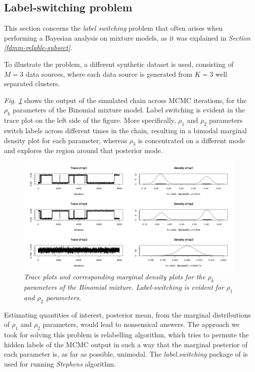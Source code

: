 \subsection{Label-switching problem} \label{integr-synth-label-sect}
This section concerns the \emph{label switching} problem that often arises when performing a Bayesian analysis on mixture models, as it was explained in \emph{Section \ref{fdmm-relable-subsect}}.

To illustrate the problem, a different synthetic dataset is used, consisting of $M=3$ data sources, where each data source is generated from $K=3$ well separated clusters. 

\emph{Fig. \ref{labelBP-pic}} shows the output of the simulated chain across MCMC iterations, for the $\rho_{k}$ parameters of the Binomial mixture model. Label switching is evident in the trace plot on the left side of the figure. More specifically, $\rho_{1}$ and $\rho_{2}$ parameters switch labels across different times in the chain, resulting in a bimodal marginal density plot for each parameter, whereas $\rho_{3}$ is concentrated on a different mode and explores the region around that posterior mode. 
\begin{figure}[!ht]
\begin{center}
 \includegraphics[scale = 0.39]{images/labelBP.png}
\caption{\emph{Trace plots and corresponding marginal density plots for the $\rho_{k}$ parameters of the Binomial mixture. Label-switching is evident for $\rho_{1}$ and $\rho_{2}$ parameters.}}
\label{labelBP-pic}
\end{center}
\end{figure}

Estimating quantities of interest, \eg posterior mean, from the marginal distributions of $\rho_{1}$ and $\rho_{2}$ parameters, would lead to nonsensical answers. The approach we took for solving this problem is \citet{Stephens2000} relabelling algorithm, which tries to permute the hidden labels of the MCMC output in such a way that the marginal posterior of each parameter is, as far as possible, unimodal. The \emph{label.switching} package of \citet{Papastamoulis2015} is used for running \emph{Stephens} algorithm. 

